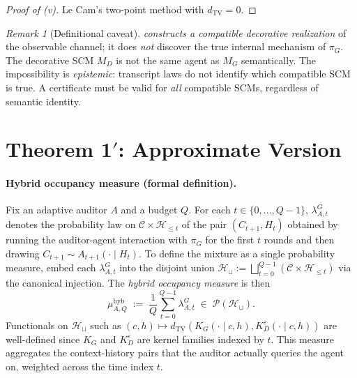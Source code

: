 \documentclass{article}
\theoremstyle{plain}
\theoremstyle{definition}
\theoremstyle{remark}
\newtheorem{remark}[theorem]{Remark}
\newcommand{\TV}{\mathrm{TV}}
\newcommand{\dtv}{d_{\TV}}
\newcommand{\C}{\mathcal{C}}
\newcommand{\Hist}{\mathcal{H}}
\begin{document}
\begin{proof}[Proof of (v)]
Le Cam's two-point method with $\dtv = 0$.
\end{proof}

\begin{remark}[Definitional caveat]\label{rem:caveat}
 \emph{constructs a compatible decorative realization}
of the observable channel; it does \emph{not} discover the true internal mechanism
of $\pi_G$. The decorative SCM $M_D$ is not the same agent as $M_G$ semantically.
The impossibility is \emph{epistemic}: transcript laws do not identify which
compatible SCM is true. A certificate must be valid for \emph{all} compatible
SCMs, regardless of semantic identity.
\end{remark}

\section{Theorem 1$'$: Approximate Version}\label{sec:approx}

\paragraph{Hybrid occupancy measure (formal definition).}
Fix an adaptive auditor $A$ and a budget $Q$. For each $t \in \{0, \ldots, Q-1\}$,
$\lambda_{A, t}^G$ denotes the probability law on $\C \times \Hist_{\le t}$ of
the pair $(C_{t+1}, H_t)$ obtained by running the auditor-agent interaction
with $\pi_G$ for the first $t$ rounds and then drawing
$C_{t+1} \sim A_{t+1}(\cdot \mid H_t)$. To define the mixture as a single
probability measure, embed each $\lambda_{A, t}^G$ into the disjoint union
$\Hist_\sqcup := \bigsqcup_{t = 0}^{Q-1} (\C \times \Hist_{\le t})$ via the
canonical injection. The \emph{hybrid occupancy measure} is then
\[
\mu_{A, Q}^{\mathrm{hyb}} \;:=\; \frac{1}{Q} \sum_{t=0}^{Q-1} \lambda_{A, t}^{G}
\;\in\; \mathcal P(\Hist_\sqcup).
\]
Functionals on $\Hist_\sqcup$ such as $(c, h) \mapsto \dtv(K_G(\cdot \mid c, h),
K_D^\varepsilon(\cdot \mid c, h))$ are well-defined since $K_G$ and
$K_D^\varepsilon$ are kernel families indexed by $t$. This measure aggregates
the context-history pairs that the auditor actually queries the agent on,
weighted across the time index $t$.
\end{document}
